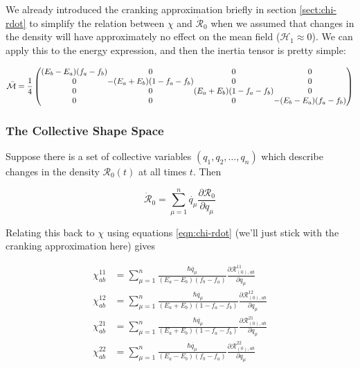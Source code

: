 We already introduced the cranking approximation briefly in section \ref{sect:chi-rdot} to simplify the relation between $\chi$ and $\mathcal{\dot{R}}_0$ when we assumed that changes in the density will have approximately no effect on the mean field ($\mathcal{H}_1 \approx 0$). We can apply this to the energy expression, and then the inertia tensor is pretty simple:

\begin{equation}\label{eqn:cranked_ATDHFB}
\mathcal{\bar{M}} = \frac{1}{4}\left(\begin{array}{@{}c@{}c@{}c@{}c@{}}
(E_b-E_a)(f_a-f_b) & 0                     & 0                     & 0 \\
0                  & -(E_a+E_b)(1-f_a-f_b) & 0                     & 0 \\
0                  & 0                     & (E_a+E_b)(1-f_a-f_b)  & 0 \\
0                  & 0                     & 0                     & -(E_b-E_a)(f_a-f_b)
\end{array}\right)
\end{equation}

\subsubsection{The Collective Shape Space}

Suppose there is a set of collective variables $(q_1,q_2,\dots,q_n)$ which describe changes in the density $\mathcal{R}_0(t)$ at all times $t$. Then

\begin{equation*}
\mathcal{\dot{R}}_0 = \sum_{\mu=1}^{n}\dot{q_\mu}\frac{\partial\mathcal{R}_0}{\partial q_\mu}
\end{equation*}

\noindent Relating this back to $\chi$ using equations \ref{eqn:chi-rdot} (we'll just stick with the cranking approximation here) gives

\begin{align*}
\chi^{11}_{ab} &= \sum_{\mu=1}^{n}\frac{\hbar\dot{q_\mu}}{(E_a-E_b)(f_b-f_a)}\frac{\partial\mathcal{R}^{11}_{(0),ab}}{\partial q_\mu} \\
\chi^{12}_{ab} &= \sum_{\mu=1}^{n}\frac{\hbar\dot{q_\mu}}{(E_a+E_b)(1-f_a-f_b)}\frac{\partial\mathcal{R}^{12}_{(0),ab}}{\partial q_\mu} \\
\chi^{21}_{ab} &= \sum_{\mu=1}^{n}\frac{\hbar\dot{q_\mu}}{(E_a+E_b)(1-f_a-f_b)}\frac{\partial\mathcal{R}^{21}_{(0),ab}}{\partial q_\mu} \\
\chi^{22}_{ab} &= \sum_{\mu=1}^{n}\frac{\hbar\dot{q_\mu}}{(E_a-E_b)(f_b-f_a)}\frac{\partial\mathcal{R}^{22}_{(0),ab}}{\partial q_\mu} \\
\end{align*}

